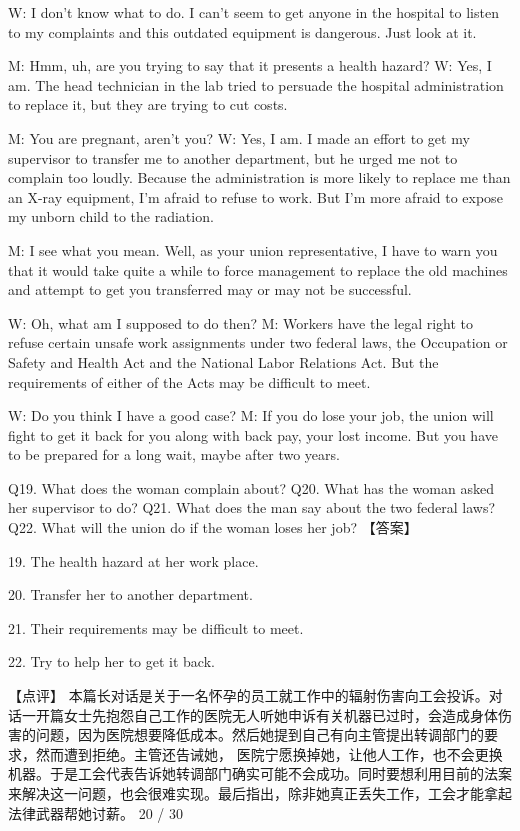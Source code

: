 \documentclass[UTF8,11pt]{ctexart}
\begin{document}
W: I don’t know what to do. I can’t seem to get anyone in the hospital to listen to my complaints and this outdated equipment is dangerous. Just look at it.


M: Hmm, uh, are you trying to say that it presents a health hazard? W: Yes, I am. The head technician in the lab tried to persuade the hospital administration to replace it, but they are trying to cut costs.


M: You are pregnant, aren’t you? W: Yes, I am. I made an effort to get my supervisor to transfer me to another department, but he urged me not to complain too loudly. Because the administration is more likely to replace me than an X-ray equipment, I’m afraid to refuse to work. But I’m more afraid to expose my unborn child to the radiation.


M: I see what you mean. Well, as your union representative, I have to warn you that it would take quite a while to force management to replace the old machines and attempt to get you transferred may or may not be successful.


W: Oh, what am I supposed to do then? M: Workers have the legal right to refuse certain unsafe work assignments under two federal laws, the Occupation or Safety and Health Act and the National Labor Relations Act. But the requirements of either of the Acts may be difficult to meet.


W: Do you think I have a good case? M: If you do lose your job, the union will fight to get it back for you along with back pay, your lost income. But you have to be prepared for a long wait, maybe after two years.


Q19. What does the woman complain about? Q20. What has the woman asked her supervisor to do? Q21. What does the man say about the two federal laws? Q22. What will the union do if the woman loses her job? 【答案】


19. The health hazard at her work place.


20. Transfer her to another department.


21. Their requirements may be difficult to meet.


22. Try to help her to get it back.


【点评】 本篇长对话是关于一名怀孕的员工就工作中的辐射伤害向工会投诉。对话一开篇女士先抱怨自己工作的医院无人听她申诉有关机器已过时，会造成身体伤害的问题，因为医院想要降低成本。然后她提到自己有向主管提出转调部门的要求，然而遭到拒绝。主管还告诫她， 医院宁愿换掉她，让他人工作，也不会更换机器。于是工会代表告诉她转调部门确实可能不会成功。同时要想利用目前的法案来解决这一问题，也会很难实现。最后指出，除非她真正丢失工作，工会才能拿起法律武器帮她讨薪。 20 / 30
\end{document}
